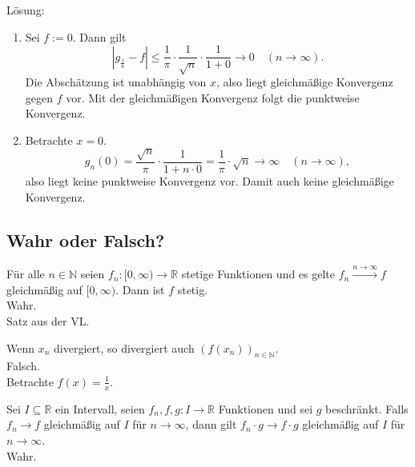 Lösung:
\begin{enumerate}
  \item Sei $f := 0$.
  Dann gilt
  \begin{displaymath}
    |g_{\frac{1}{n}} - f| \leq \frac{1}{\pi} \cdot \frac{1}{\sqrt{n}} \cdot \frac{1}{1 + 0} \to 0 \quad (n \to \infty).
  \end{displaymath}
  Die Abschätzung ist unabhängig von $x$, also liegt gleichmäßige Konvergenz gegen $f$ vor.
  Mit der gleichmäßigen Konvergenz folgt die punktweise Konvergenz.
  
  \item Betrachte $x = 0$.
  \begin{displaymath}
    g_n(0) = \frac{\sqrt{n}}{\pi} \cdot \frac{1}{1 + n \cdot 0} = \frac{1}{\pi} \cdot \sqrt{n} \to \infty \quad (n \to \infty),
  \end{displaymath}
  also liegt keine punktweise Konvergenz vor.
  Damit auch keine gleichmäßige Konvergenz.
\end{enumerate}

\subsection{Wahr oder Falsch?}
Für alle $n \in \mathbb{N}$ seien $f_n : [0, \infty) \to \mathbb{R}$ stetige Funktionen und es gelte $f_n \xrightarrow{n \to \infty} f$ gleichmäßig auf $[0,\infty)$. Dann ist $f$ stetig.\\
Wahr.\\
Satz aus der VL.

Wenn $x_n$ divergiert, so divergiert auch $(f(x_n))_{n \in \mathbb{N}}$.\\
Falsch.\\
Betrachte $f(x) = \frac{1}{x}$.

Sei $I \subseteq \mathbb{R}$ ein Intervall, seien $f_n, f, g : I \to \mathbb{R}$ Funktionen und sei $g$ beschränkt.
Falls $f_n \to f$ gleichmäßig auf $I$ für $n \to \infty$, dann gilt $f_n \cdot g \to f \cdot g$ gleichmäßig auf $I$ für $n \to \infty$.\\
Wahr.